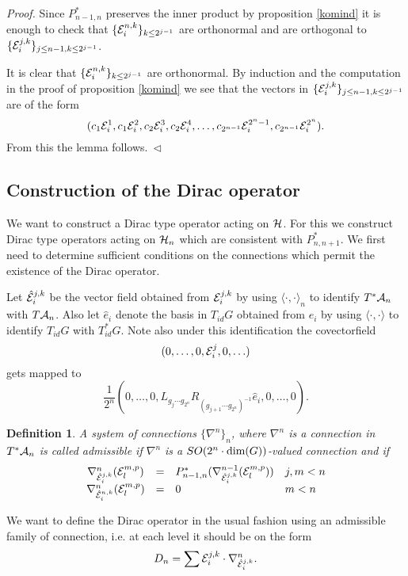 \documentclass[12pt]{article}
\newcommand{\eproof}{{~\hfill$ \triangleleft$}}
\def\ca{{\cal A}}
\def\ce{{\cal E}}
\def\ch{{\cal H}}
\newtheorem{definition}[thm]{Definition}
\begin{document}
{\textit{Proof.} Since $P^*_{n-1,n}$ preserves the inner product by proposition \ref{komind} it is enough to check that 
$\{\ce_i^{n,k}\}_{k\leq 2^{j-1}}$ are orthonormal and are orthogonal to $\{\ce_i^{j,k}\}_{j\leq n-1,k\leq 2^{j-1}}$. 

It is clear that $\{\ce_i^{n,k}\}_{k\leq 2^{j-1}}$ are orthonormal. By induction and the computation in the proof of proposition \ref{komind}  we see that the vectors in $\{\ce_i^{j,k}\}_{j\leq n-1,k\leq 2^{j-1}}$ are of the form
$$(c_1\ce_i^1,c_1\ce_i^2,c_2\ce_i^3,c_2\ce_i^4,\ldots ,c_{2^{n-1}}\ce_i^{2^n-1},c_{2^{n-1}}\ce_i^{2^n}).$$ 
From this the lemma follows.\eproof








\subsection{Construction of the Dirac operator}
We want to construct a Dirac type operator acting on $\ch$. For this we construct  Dirac type operators acting on $\ch_n$ which are consistent with $P^*_{n,n+1}$.  We first need to determine sufficient conditions on the  connections which permit the existence of the Dirac operator.

Let $\hat{\ce}_i^{j,k}$ be the vector field obtained from $\ce_i^{j,k}$ by using $\langle \cdot ,\cdot \rangle_{n}$ to identify $T^*\ca_{n}$ with $T\ca_{n}$. Also let $\hat{e}_i$ denote the basis in $T_{id}G$ obtained from $e_i$ by using $\langle\cdot ,\cdot \rangle $ to identify $T_{id}G$ with $T^*_{id}G$. Note also  under this identification
the covectorfield
$$(0,\ldots ,0, \ce_i^j,0, \ldots) $$
gets mapped to
$$\frac{1}{2^{n}}(0,\ldots,0,L_{g_j\cdots g_{2^n}}R_{(g_{j+1}\cdots g_{2^n})^{-1}}\hat{e}_i,0 , \ldots,0).$$ 



\begin{definition}
A system of connections $\{ \nabla^n\}_n$, where $\nabla^n$ is a connection in $T^*\ca_{n}$ is called admissible if
$\nabla^n$ is a $SO(2^n\cdot \hbox{dim}(G))$-valued connection and if
$$\begin{array}{ccll}
\nabla^n_{\hat{\ce}_i^{j,k}}(\ce_l^{m,p})&=&P^*_{n-1,n}(\nabla^{n-1}_{\hat{\ce}_i^{j,k}}(\ce_l^{m,p}))&j,m<n\\
 \nabla^n_{\hat{\ce}_i^{n,k}}(\ce_l^{m,p})&=&0&m<n
\end{array}$$
\end{definition}
We want to define the Dirac operator in the usual fashion using an admissible family of connection, i.e. at each level it should be on the form
$$D_n=\sum \ce_i^{j,k}\cdot \nabla^n_{\hat{\ce}_i^{j,k}}.$$

}
\end{document}
